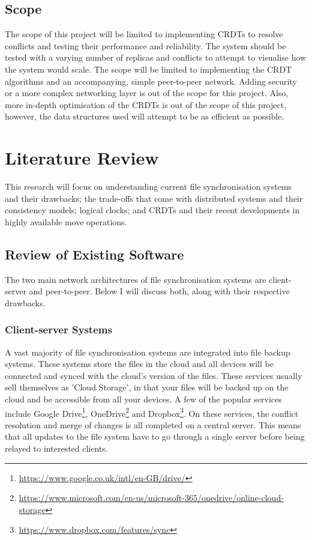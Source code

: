 \documentclass[12pt]{report}
\begin{document}
\section{Scope}
The scope of this project will be limited to implementing CRDTs to resolve conflicts and testing their performance and reliability. The system should be tested with a varying number of replicas and conflicts to attempt to visualise how the system would scale. The scope will be limited to implementing the CRDT algorithms and an accompanying, simple peer-to-peer network. Adding security or a more complex networking layer is out of the scope for this project. Also, more in-depth optimisation of the CRDTs is out of the scope of this project, however, the data structures used will attempt to be as efficient as possible. \par

\newpage
\chapter{Literature Review}
This research will focus on understanding current file synchronisation systems and their drawbacks; the trade-offs that come with distributed systems and their consistency models; logical clocks; and CRDTs and their recent developments in highly available move operations.

\section{Review of Existing Software}
The two main network architectures of file synchronisation systems are client-server and peer-to-peer. Below I will discuss both, along with their respective drawbacks.


\subsection{Client-server Systems}
A vast majority of file synchronisation systems are integrated into file backup systems. These systems store the files in the cloud and all devices will be connected and synced with the cloud's version of the files. These services usually sell themselves as 'Cloud Storage', in that your files will be backed up on the cloud and be accessible from all your devices. A few of the popular services include Google Drive\footnote{\url{https://www.google.co.uk/intl/en-GB/drive/}}, OneDrive\footnote{\url{https://www.microsoft.com/en-us/microsoft-365/onedrive/online-cloud-storage}} and Dropbox\footnote{\url{https://www.dropbox.com/features/sync}}. On these services, the conflict resolution and merge of changes is all completed on a central server. This means that all updates to the file system have to go through a single server before being relayed to interested clients. \par
\end{document}

